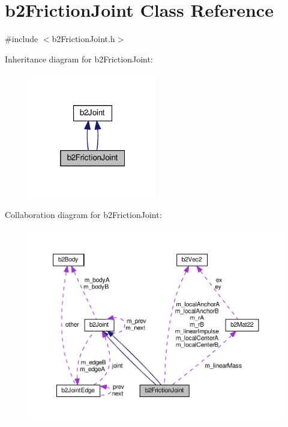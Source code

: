 \hypertarget{classb2FrictionJoint}{}\section{b2\+Friction\+Joint Class Reference}
\label{classb2FrictionJoint}


{\ttfamily \#include $<$b2\+Friction\+Joint.\+h$>$}



Inheritance diagram for b2\+Friction\+Joint\+:
\nopagebreak
\begin{figure}[H]
\begin{center}
\leavevmode
\includegraphics[width=160pt]{classb2FrictionJoint__inherit__graph}
\end{center}
\end{figure}


Collaboration diagram for b2\+Friction\+Joint\+:
\nopagebreak
\begin{figure}[H]
\begin{center}
\leavevmode
\includegraphics[width=350pt]{classb2FrictionJoint__coll__graph}
\end{center}
\end{figure}
